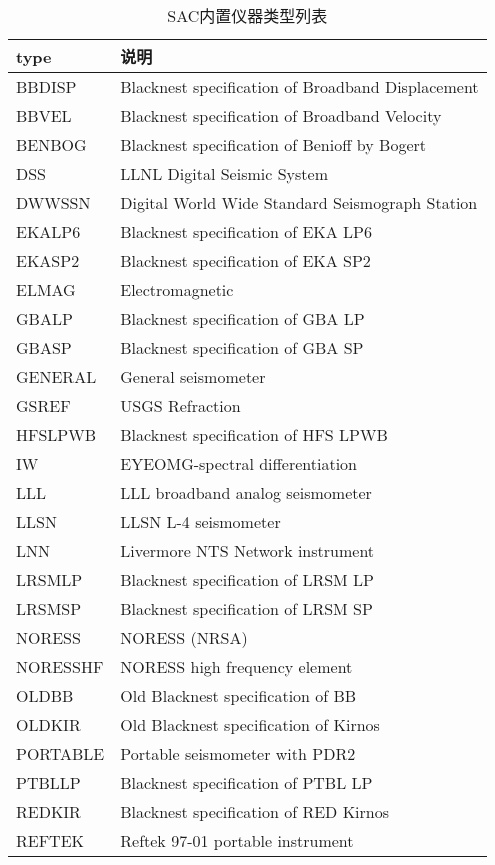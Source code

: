 \begin{table}[tp]
\centering
\ttfamily
\small
\caption{SAC内置仪器类型列表}	
\label{table:instrument-type}
\begin{tabular}{ll}
\toprule
type	 &	说明	\\
\midrule
BBDISP   &  Blacknest specification of Broadband Displacement \\
BBVEL    &  Blacknest specification of Broadband Velocity	\\	
BENBOG   &  Blacknest specification of Benioff by Bogert	\\
DSS      &  LLNL Digital Seismic System	\\	
DWWSSN   &  Digital World Wide Standard Seismograph Station	\\
EKALP6   &  Blacknest specification of EKA LP6	\\
EKASP2   &  Blacknest specification of EKA SP2	\\
ELMAG    &  Electromagnetic	\\	
GBALP    &  Blacknest specification of GBA LP	\\
GBASP    &  Blacknest specification of GBA SP	\\
GENERAL  &  General seismometer	\\
GSREF    &  USGS Refraction	\\
HFSLPWB  &  Blacknest specification of HFS LPWB	\\
IW       &  EYEOMG-spectral differentiation	\\
LLL      &  LLL broadband analog seismometer	\\
LLSN     &  LLSN L-4 seismometer	\\	
LNN      &  Livermore NTS Network instrument	\\
LRSMLP   &  Blacknest specification of LRSM LP	\\
LRSMSP   &  Blacknest specification of LRSM SP	\\
NORESS   &  NORESS (NRSA)	\\
NORESSHF &  NORESS high frequency element	\\
OLDBB    &  Old Blacknest specification of BB	\\
OLDKIR   &  Old Blacknest specification of Kirnos	\\	
PORTABLE &  Portable seismometer with PDR2	\\
PTBLLP   &  Blacknest specification of PTBL LP	\\
REDKIR   &  Blacknest specification of RED Kirnos	\\	
REFTEK   &  Reftek 97-01 portable instrument	\\

\end{tabular}
\end{table}
